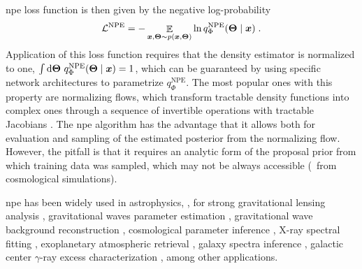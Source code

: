 \Gls*{npe} loss function is then given by the negative log-probability
%
\begin{equation} \label{eq:lnpe}
	\mathcal{L}^\text{NPE}=-\mathop{\mathbb{E}}\limits_{\bm{x}, \bm{\Theta} \sim p(\bm{x}, \bm{\Theta})} \ln q^\text{NPE}_\Phi(\bm{\Theta} \mid \bm{x}) \;.
\end{equation}
%
Application of this loss function requires that the density estimator is normalized to one, $\int \dd\bm{\Theta}\ q^\text{NPE}_\Phi(\bm{\Theta} \mid \bm{x})=1$, which can be guaranteed by using specific network architectures to parametrize $q^\text{NPE}_\Phi$. The most popular ones with this property are normalizing flows, which transform tractable density functions into complex ones through a sequence of invertible operations with tractable Jacobians \cite{kobyzev2020normalizing, papamakarios2021normalizing}. The \gls*{npe} algorithm has the advantage that it allows both for evaluation and sampling of the estimated posterior from the normalizing flow. However, the pitfall is that it requires an analytic form of the proposal prior from which training data was sampled, which may not be always accessible (\eg\ from cosmological simulations).

\Gls*{npe} has been widely used in astrophysics, \eg, for strong gravitational lensing analysis \cite{Wagner-Carena:2020yun, Wagner-Carena:2022mrn, wagnercarena2024strong}, gravitational waves parameter estimation \cite{Dax:2021tsq, Crisostomi:2023tle, kolmus2024tuning}, gravitational wave background reconstruction \cite{Dimitriou:2023knw}, cosmological parameter inference \cite{Tucci:2023bag}, X-ray spectral fitting \cite{Barret:2024kvc}, exoplanetary atmospheric retrieval \cite{vasist2023neural}, galaxy spectra inference \cite{Hahn:2022nda, khullar2022digs}, galactic center $\gamma$-ray excess characterization \cite{Mishra-Sharma:2021oxe, Christy:2024hou}, among other applications.

